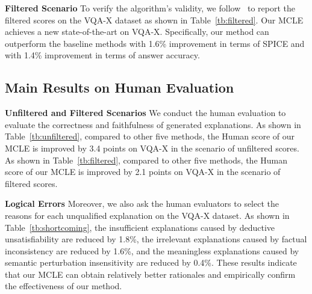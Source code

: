 \documentclass[letterpaper]{article} %
\begin{document}
\noindent
\textbf{Filtered Scenario} To verify the algorithm's validity, we follow~\cite{kayser2021vil} to report the filtered scores on the VQA-X dataset as shown in Table~\ref{tb:filtered}. Our MCLE achieves a new state-of-the-art on VQA-X. Specifically, our method can outperform the baseline methods with 1.6\% improvement in terms of SPICE and with 1.4\% improvement in terms of answer accuracy.

\subsection{Main Results on Human Evaluation}

\noindent
\textbf{Unfiltered and Filtered Scenarios} We conduct the human evaluation to evaluate the correctness and faithfulness of generated explanations. As shown in Table~\ref{tb:unfiltered}, compared to other five methods, the Human score of our MCLE is improved by 3.4 points on VQA-X in the scenario of unfiltered scores. As shown in Table~\ref{tb:filtered}, compared to other five methods, the Human score of our MCLE is improved by 2.1 points on VQA-X in the scenario of filtered scores. 

\noindent
\textbf{Logical Errors} Moreover, we also ask the human evaluators to select the reasons for each unqualified explanation on the VQA-X dataset. As shown in Table~\ref{tb:shortcoming}, the insufficient explanations caused by deductive unsatisfiability are reduced by 1.8\%, the irrelevant explanations caused by factual inconsistency are reduced by 1.6\%, and the meaningless explanations caused by semantic perturbation insensitivity are reduced by 0.4\%. These results indicate that our MCLE can obtain relatively better rationales and empirically confirm the effectiveness of our method. 
\end{document}
